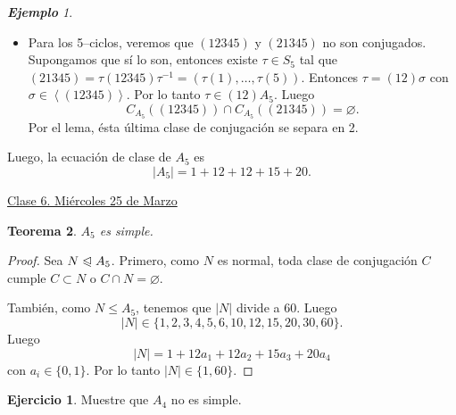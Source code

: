 \documentclass{article}
\newtheorem{theorem}{Teorema}[subsection]
\theoremstyle{definition}
\newtheorem{exercise}{Ejercicio}
\theoremstyle{remark}
\newtheorem{example}[theorem]{\textbf{Ejemplo}}
\numberwithin{equation}{section}
\newcommand{\normal}{\trianglelefteqslant}
\newcommand{\abs}[1]{\left| #1 \right|}
\newcommand{\gen}[1]{\left\langle #1 \right\rangle}
\newcommand{\fecha}[1]{\begin{flushright} \underline{#1} \end{flushright}}
\begin{document}
\begin{example}
\begin{itemize}
    \item Para los 5--ciclos, veremos que $(12345)$ y $(21345)$ no son conjugados. Supongamos que sí lo son, entonces existe $\tau \in S_5$ tal que $(21345) = \tau(12345)\tau^{-1} = (\tau(1), \dots, \tau(5))$.
    Entonces $\tau = (12) \sigma$ con $\sigma \in \gen{(12345)}$. Por lo tanto $\tau \in (12)A_5$. Luego
    \[C_{A_5}((12345)) \cap C_{A_5}((21345)) = \varnothing.\]
    Por el lema, ésta última clase de conjugación se separa en 2.
  \end{itemize}
  Luego, la ecuación de clase de $A_5$ es $$\abs{A_5} = 1 + 12 + 12 + 15 + 20.$$
\end{example}

\fecha{Clase 6. Miércoles 25 de Marzo}

\begin{theorem}
  $A_5$ es simple.
\end{theorem}
\begin{proof}
  Sea $N \normal A_5$.
  Primero, como $N$ es normal, toda clase de conjugación $C$ cumple $C \subset N$ o $C \cap N = \varnothing$.

  También, como $N \leqslant A_5$, tenemos que $\abs N$ divide a 60. Luego
  \[\abs{N} \in \{1,2,3,4,5,6,10,12,15,20,30,60\}.\]
  Luego $$\abs N = 1 + 12a_1 + 12a_2 + 15a_3 + 20a_4$$ con $a_i \in \{0,1\}$. Por lo tanto $\abs N \in \{1,60\}$.
\end{proof}

\begin{exercise}
  Muestre que $A_4$ no es simple.
\end{exercise}
\end{document}
